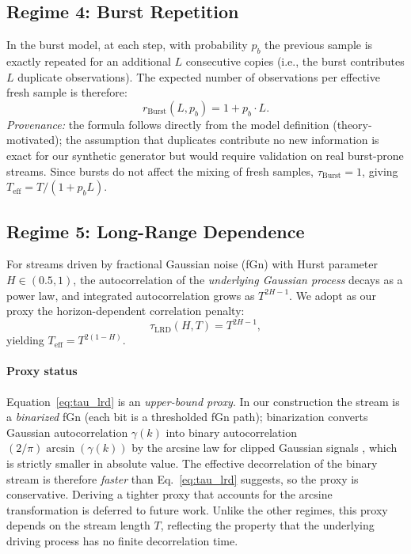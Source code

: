 \documentclass[sensors,article,submit,pdftex,moreauthors]{Definitions/mdpi}
\newcommand{\Teff}{T_{\mathrm{eff}}}
\providecommand{\DIFadd}[1]{{\protect\color{blue}#1}} %
\providecommand{\DIFaddbegin}{} %
\providecommand{\DIFaddend}{} %
\begin{document}
\subsection{Regime 4: Burst Repetition}

In the burst model, at each step, with probability $p_b$ the previous sample is exactly repeated for an additional $L$ consecutive copies (i.e., the burst contributes $L$ duplicate observations). The expected number of observations per effective fresh sample is therefore:
\begin{equation}
    r_{\text{Burst}}(L, p_b) = 1 + p_b \cdot L.
    \label{eq:r_burst}
\end{equation}
\emph{Provenance:} the formula follows directly from the model definition (theory\nobreakdash-motivated); the assumption that duplicates contribute no new information is exact for our synthetic generator but would require validation on real burst-prone streams. Since bursts do not affect the mixing of fresh samples, $\tau_{\text{Burst}} = 1$, giving $\Teff = T/(1 + p_b L)$.

\subsection{Regime 5: Long-Range Dependence}

For streams driven by fractional Gaussian noise (fGn) with Hurst parameter $H \in (0.5, 1)$, the autocorrelation of the \emph{underlying Gaussian process} decays as a power law, and integrated autocorrelation grows as $T^{2H-1}$. We adopt as our proxy the horizon-dependent correlation penalty:
\begin{equation}
    \tau_{\text{LRD}}(H, T) = T^{2H-1},
    \label{eq:tau_lrd}
\end{equation}
yielding $\Teff = T^{2(1-H)}$.

\paragraph{Proxy status} Equation~\eqref{eq:tau_lrd} is an \emph{upper-bound proxy}. In our construction the stream is a \emph{binarized} fGn (each bit is a thresholded fGn path); binarization converts Gaussian autocorrelation $\gamma(k)$ into binary autocorrelation $(2/\pi)\arcsin(\gamma(k))$ \DIFaddbegin \DIFadd{by the arcsine law for clipped Gaussian signals }\citep{vanvleck1966spectrum}\DIFaddend , which is strictly smaller in absolute value. The effective decorrelation of the binary stream is therefore \emph{faster} than Eq.~\eqref{eq:tau_lrd} suggests, so the proxy is conservative. Deriving a tighter proxy that accounts for the arcsine transformation is deferred to future work. Unlike the other regimes, this proxy depends on the stream length $T$, reflecting the property that the underlying driving process has no finite decorrelation time.
\end{document}
